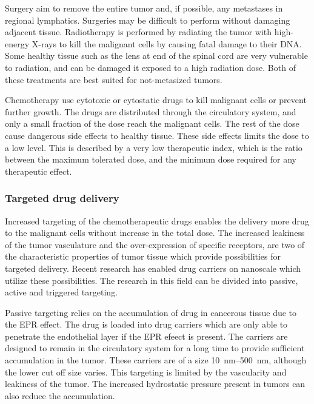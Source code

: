 Surgery aim to remove the entire tumor and, if possible, any metastases in regional lymphatics. Surgeries may be difficult to perform without damaging adjacent tissue. Radiotherapy is performed by radiating the tumor with high-energy X-rays to kill the malignant cells by causing fatal damage to their DNA. Some healthy tissue such as the lens at end of the spinal cord are very vulnerable to radiation, and can be damaged it exposed to a high radiation dose. Both of these treatments are best suited for not-metasized tumors. 

Chemotherapy use cytotoxic or cytostatic drugs to kill malignant cells or prevent further growth. The drugs are distributed through the circulatory system, and only a small fraction of the dose reach the malignant cells. The rest of the dose cause dangerous side effects to healthy tissue\cite{doi:10.1056/NEJM200106283442607}. These side effects limits the dose to a low level. This is described by a very low therapeutic index, which is the ratio between the maximum tolerated dose, and the minimum dose required for any therapeutic effect. 
 
\subsubsection{Targeted drug delivery}
Increased targeting of the chemotherapeutic drugs enables the delivery more drug to the malignant cells without increase in the total dose.  The increased leakiness of the tumor vasculature and the over-expression of specific receptors, are two of the characteristic properties of tumor tissue which provide possibilities for targeted delivery. Recent research has enabled drug carriers on nanoscale which utilize these possibilities\cite{Jafari}. The research in this field can be divided into passive, active and triggered targeting. 


Passive targeting relies on the accumulation of drug in cancerous tissue due to the EPR effect. The drug is loaded into drug carriers which are only able to penetrate the endothelial layer if the EPR efeect is present\cite{Andresen2010}. The carriers are designed to remain in the circulatory system for a long time to provide sufficient accumulation in the tumor. These carriers are of a size \SIrange{10}{500}{\nano\meter}, although the lower cut off size varies\cite{Hofmann}. This targeting is limited by the vascularity and leakiness of the tumor. The increased hydrostatic pressure present in tumors can also reduce the accumulation\cite{Bae2009}.  

